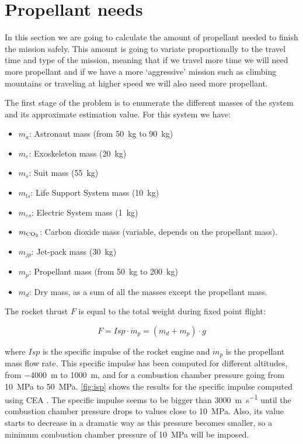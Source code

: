 \documentclass[twocolumn]{article}
\newcommand{\COtwo}{\textnormal{CO}_2}
\begin{document}
\section{Propellant needs}

In this section we are going to calculate the amount of propellant needed to 
finish the mission safely. This amount is going to variate proportionally to 
the travel time and type of the mission, meaning that if we travel more time we 
will need more propellant and if we have a more `aggressive' mission such as 
climbing mountains or traveling at higher speed we will also need more 
propellant. 

The first stage of the problem is to enumerate the different masses of the 
system and its approximate estimation value. For this system we have:

\begin{itemize}
	\item $m_{a}$: Astronaut mass (from \SI{50}{\kilogram} to 
\SI{90}{\kilogram})
	\item $m_{e}$: Exoskeleton mass (\SI{20}{\kilogram})
	\item $m_{s}$: Suit mass (\SI{55}{\kilogram})
	\item $m_{ls}$: Life Support System mass (\SI{10}{\kilogram})
	\item $m_{es}$: Electric System mass (\SI{1}{\kilogram})
	\item $m_{\COtwo}$: Carbon dioxide mass (variable, depends on the 
propellant mass).
	\item $m_{jp}$: Jet-pack mass (\SI{30}{\kilogram})
	\item $m_{p}$: Propellant mass (from \SI{50}{\kilogram} to 
\SI{200}{\kilogram})
        \item $m_d$: Dry mass, as a sum of all the masses except the propellant 
mass.
\end{itemize} 

The rocket thrust $F$ is equal to the total weight during fixed point flight:

\begin{equation}
  F = Isp \cdot \dot{m}_p = \left( m_d + m_p \right) \cdot g
\end{equation}

\noindent where $Isp$ is the specific impulse of the rocket engine and 
$\dot{m}_p$ is the propellant mass flow rate. This specific impulse has been 
computed for different altitudes, from \SI{-4000}{\metre} to \SI{1000}{\metre}, 
and for a combustion chamber pressure going from \SI{10}{\mega\pascal} to 
\SI{50}{\mega\pascal}. \autoref{fig:isp} shows the results for the specific 
impulse computed using CEA \cite{cea}. The specific impulse seems to be bigger 
than \SI{3000}{\metre\per\second} until the combustion chamber pressure drops 
to values close to \SI{10}{\mega\pascal}. Also, its value starts to decrease in 
a dramatic way as this pressure becomes smaller, so a minimum combustion 
chamber pressure of \SI{10}{\mega\pascal} will be imposed.
\end{document}
